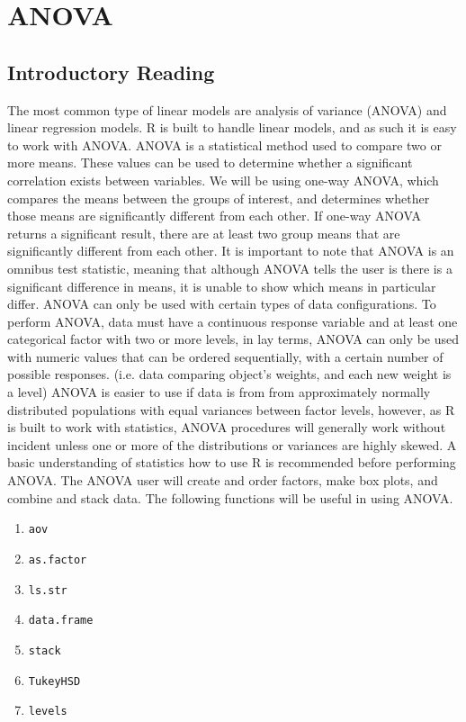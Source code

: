 \chapter{ANOVA}
\section{Introductory Reading}


The most common type of linear models are analysis of variance (ANOVA) and linear regression models. 
R is built to handle linear models, and as such it is easy to work with ANOVA. 
ANOVA is a statistical method used to compare two or more means. 
These values can be used to determine whether a significant correlation exists between variables. 
We will be using one-way ANOVA, which compares the means between the groups of interest, and determines whether those means are significantly different from each other. 
If one-way ANOVA returns a significant result, there are at least two group means that are significantly different from each other. 
It is important to note that ANOVA is an omnibus test statistic, meaning that although ANOVA tells the user is there is a significant difference in means, it is unable to show which means in particular differ.
ANOVA can only be used with certain types of data configurations. 
To perform ANOVA, data must have a continuous response variable and at least one categorical factor with two or more levels, in lay terms, ANOVA can only be used with numeric values that can be ordered sequentially, with a certain number of possible responses. 
(i.e. data comparing object's weights, and each new weight is a level) 
ANOVA is easier to use if data is from from approximately normally distributed populations with equal variances between factor levels, however, as R is built to work with statistics, ANOVA procedures will generally work without incident unless one or more of the distributions or variances are highly skewed.
A basic understanding of statistics how to use R is recommended before performing ANOVA. The ANOVA user will create and order factors, make box plots, and combine and stack data. 
\cite{cran-r}
The following functions will be useful in using ANOVA.
\begin{enumerate}
        \item \texttt{aov}
        \item \texttt{as.factor}
        \item \texttt{ls.str}
        \item \texttt{data.frame}
        \item \texttt{stack}
        \item \texttt{TukeyHSD}
\item \texttt{levels}
\end{enumerate}

